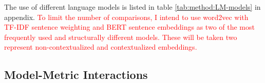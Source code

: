 


The use of different language models is listed in table \ref{tab:method:LM-models} in appendix. \textcolor{red}{To limit the number of comparisons, I intend to use word2vec with TF-IDF sentence weighting and BERT sentence embeddings as two of the most frequently used and structurally different models. These will be taken two represent non-contextualized and contextualized embeddings.}


\subsection{Model-Metric Interactions}
\label{sec:review:LM:interaction}

